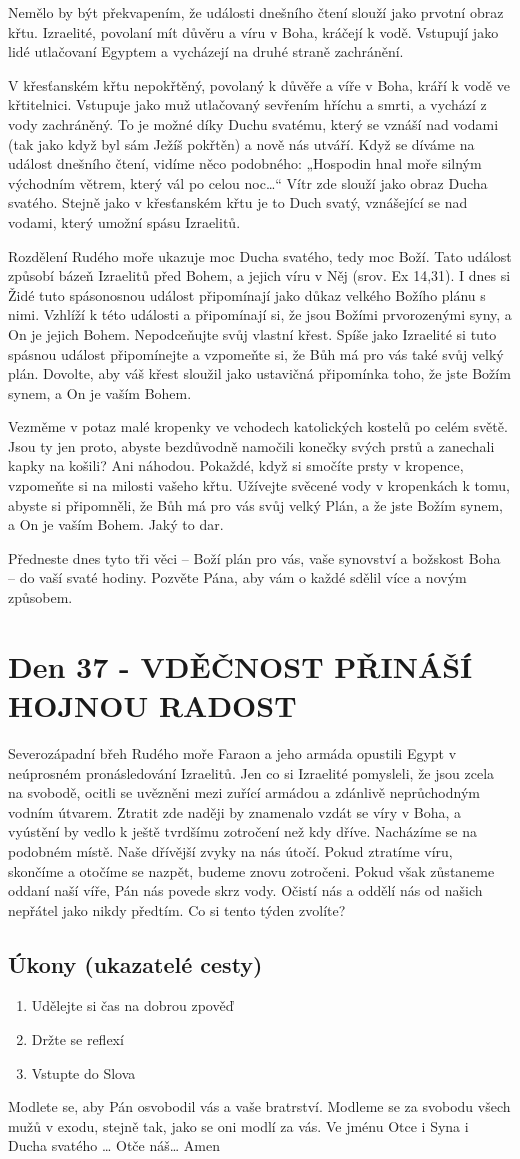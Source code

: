 \documentclass[11pt]{article}
\newcommand{\zacatekSestyTyden}{
  Severozápadní břeh Rudého moře \newline 
  Faraon a jeho armáda opustili Egypt v neúprosném pronásledování Izraelitů. Jen co si Izraelité pomysleli, že jsou zcela na svobodě, ocitli se uvězněni mezi zuřící armádou a zdánlivě neprůchodným vodním útvarem. Ztratit zde naději by znamenalo vzdát se víry v Boha, a vyústění by vedlo k ještě tvrdšímu zotročení než kdy dříve. Nacházíme se na podobném místě. Naše dřívější zvyky na nás útočí. Pokud ztratíme víru, skončíme a otočíme se nazpět, budeme znovu zotročeni. Pokud však zůstaneme oddaní naší víře, Pán nás povede skrz vody. Očistí nás a oddělí nás od našich nepřátel jako nikdy předtím. Co si tento týden zvolíte?

\subsection*{Úkony (ukazatelé cesty)}
\begin{enumerate}
  \item Udělejte si čas na dobrou zpověď
  \item Držte se reflexí
  \item Vstupte do Slova
\end{enumerate}
Modlete se, aby Pán osvobodil vás a vaše bratrství. \newline
Modleme se za svobodu všech mužů v exodu, stejně tak, jako se oni modlí za vás.\newline
Ve jménu Otce i Syna i Ducha svatého …  Otče náš… Amen
}
\begin{document}
Nemělo by být překvapením, že události dnešního čtení slouží jako prvotní obraz křtu. Izraelité, povolaní mít důvěru a
víru v Boha, kráčejí k vodě. Vstupují jako lidé utlačovaní Egyptem a vycházejí na druhé straně zachránění.

V křesťanském křtu nepokřtěný, povolaný k důvěře a víře v Boha, kráří k vodě ve křtitelnici. Vstupuje jako muž
utlačovaný sevřením hříchu a smrti, a vychází z vody zachráněný. To je možné díky Duchu svatému, který se vznáší
nad vodami (tak jako když byl sám Ježíš pokřtěn) a nově nás utváří. Když se díváme na událost dnešního čtení, vidíme
něco podobného: „Hospodin hnal moře silným východním větrem, který vál po celou noc…“ Vítr zde slouží jako obraz
Ducha svatého. Stejně jako v křesťanském křtu je to Duch svatý, vznášející se nad vodami, který umožní spásu
Izraelitů.

Rozdělení Rudého moře ukazuje moc Ducha svatého, tedy moc Boží. Tato událost způsobí bázeň Izraelitů před
Bohem, a jejich víru v Něj (srov. Ex 14,31). I dnes si Židé tuto spásonosnou událost připomínají jako důkaz velkého
Božího plánu s nimi. Vzhlíží k této události a připomínají si, že jsou Božími prvorozenými syny, a On je jejich Bohem.
Nepodceňujte svůj vlastní křest. Spíše jako Izraelité si tuto spásnou událost připomínejte a vzpomeňte si, že Bůh má
pro vás také svůj velký plán. Dovolte, aby váš křest sloužil jako ustavičná připomínka toho, že jste Božím synem, a On
je vaším Bohem.

Vezměme v potaz malé kropenky ve vchodech katolických kostelů po celém světě. Jsou ty jen proto, abyste
bezdůvodně namočili konečky svých prstů a zanechali kapky na košili? Ani náhodou. Pokaždé, když si smočíte prsty
v kropence, vzpomeňte si na milosti vašeho křtu. Užívejte svěcené vody v kropenkách k tomu, abyste si připomněli, že
Bůh má pro vás svůj velký Plán, a že jste Božím synem, a On je vaším Bohem. Jaký to dar.

Předneste dnes tyto tři věci – Boží plán pro vás, vaše synovství a božskost Boha – do vaší svaté hodiny. Pozvěte Pána,
aby vám o každé sdělil více a novým způsobem.

\newpage
\section{Den 37 - VDĚČNOST PŘINÁŠÍ HOJNOU RADOST}
\zacatekSestyTyden
\end{document}
